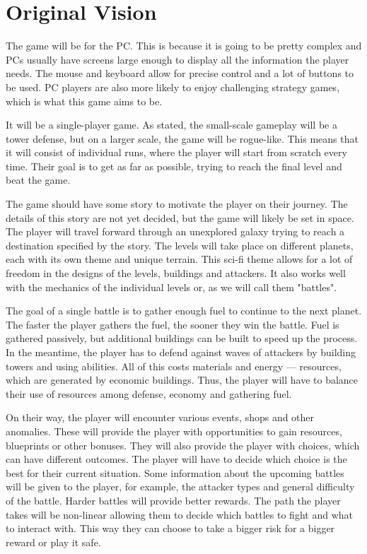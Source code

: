 \section{Original Vision} \label{sec:original-vision}

The game will be for the PC.
This is because it is going to be pretty complex and PCs usually have screens large enough to display all the information the player needs.
The mouse and keyboard allow for precise control and a lot of buttons to be used.
PC players are also more likely to enjoy challenging strategy games, which is what this game aims to be.

It will be a single-player game.
As stated, the small-scale gameplay will be a tower defense, but on a larger scale, the game will be rogue-like.
This means that it will consist of individual runs, where the player will start from scratch every time.
Their goal is to get as far as possible, trying to reach the final level and beat the game.

The game should have some story to motivate the player on their journey.
The details of this story are not yet decided, but the game will likely be set in space.
The player will travel forward through an unexplored galaxy trying to reach a destination specified by the story.
The levels will take place on different planets, each with its own theme and unique terrain.
This sci-fi theme allows for a lot of freedom in the designs of the levels, buildings and attackers.
It also works well with the mechanics of the individual levels or, as we will call them "battles".

The goal of a single battle is to gather enough fuel to continue to the next planet.
The faster the player gathers the fuel, the sooner they win the battle.
Fuel is gathered passively, but additional buildings can be built to speed up the process.
In the meantime, the player has to defend against waves of attackers by building towers and using abilities.
All of this costs materials and energy --- resources, which are generated by economic buildings.
Thus, the player will have to balance their use of resources among defense, economy and gathering fuel.

On their way, the player will encounter various events, shops and other anomalies.
These will provide the player with opportunities to gain resources, blueprints or other bonuses.
They will also provide the player with choices, which can have different outcomes.
The player will have to decide which choice is the best for their current situation.
Some information about the upcoming battles will be given to the player, for example, the attacker types and general difficulty of the battle.
Harder battles will provide better rewards.
The path the player takes will be non-linear allowing them to decide which battles to fight and what to interact with.
This way they can choose to take a bigger risk for a bigger reward or play it safe.

